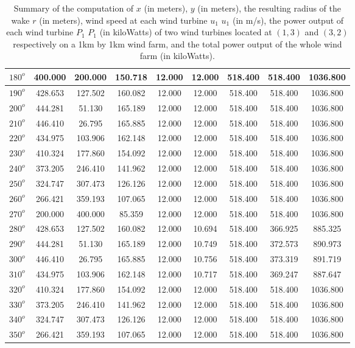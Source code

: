 \begin{table}[H]
\begin{tabular}{|c|c|c|c|c|c|c|c|c|}
$180^o$	&400.000	&200.000	&150.718	&12.000	&12.000	&518.400	&518.400	&1036.800 \\ \hline
$190^o$	&428.653	&127.502	&160.082	&12.000	&12.000	&518.400	&518.400	&1036.800 \\ \hline
$200^o$	&444.281	&51.130	&165.189	&12.000	&12.000	&518.400	&518.400	&1036.800 \\ \hline
$210^o$	&446.410	&26.795	&165.885	&12.000	&12.000	&518.400	&518.400	&1036.800 \\ \hline
$220^o$	&434.975	&103.906	&162.148	&12.000	&12.000	&518.400	&518.400	&1036.800 \\ \hline
$230^o$	&410.324	&177.860	&154.092	&12.000	&12.000	&518.400	&518.400	&1036.800 \\ \hline
$240^o$	&373.205	&246.410	&141.962	&12.000	&12.000	&518.400	&518.400	&1036.800 \\ \hline
$250^o$	&324.747	&307.473	&126.126	&12.000	&12.000	&518.400	&518.400	&1036.800 \\ \hline
$260^o$	&266.421	&359.193	&107.065	&12.000	&12.000	&518.400	&518.400	&1036.800 \\ \hline
$270^o$	&200.000	&400.000	&85.359	&12.000	&12.000	&518.400	&518.400	&1036.800 \\ \hline
$280^o$	&428.653	&127.502	&160.082	&12.000	&10.694	&518.400	&366.925	&885.325 \\ \hline
$290^o$	&444.281	&51.130	&165.189	&12.000	&10.749	&518.400	&372.573	&890.973 \\ \hline
$300^o$	&446.410	&26.795	&165.885	&12.000	&10.756	&518.400	&373.319	&891.719 \\ \hline
$310^o$	&434.975	&103.906	&162.148	&12.000	&10.717	&518.400	&369.247	&887.647 \\ \hline
$320^o$	&410.324	&177.860	&154.092	&12.000	&12.000	&518.400	&518.400	&1036.800 \\ \hline
$330^o$	&373.205	&246.410	&141.962	&12.000	&12.000	&518.400	&518.400	&1036.800 \\ \hline
$340^o$	&324.747	&307.473	&126.126	&12.000	&12.000	&518.400	&518.400	&1036.800 \\ \hline
$350^o$	&266.421	&359.193	&107.065	&12.000	&12.000	&518.400	&518.400	&1036.800 \\ \hline
        \end{tabular}
        \caption{Summary of the computation of $x$ (in meters), $y$ (in meters), the resulting radius of the wake $r$ (in meters), wind speed at each wind turbine $u_1$ $u_1$ (in m/s), the power output of each wind turbine $P_1$ $P_1$ (in kiloWatts) of two wind turbines located at $(1,3)$ and $(3,2)$ respectively on a 1km by 1km wind farm, and the total power output of the whole wind farm (in kiloWatts).}
        \label{summaryAvg2}
    \end{table}
    \doublespacing
    
